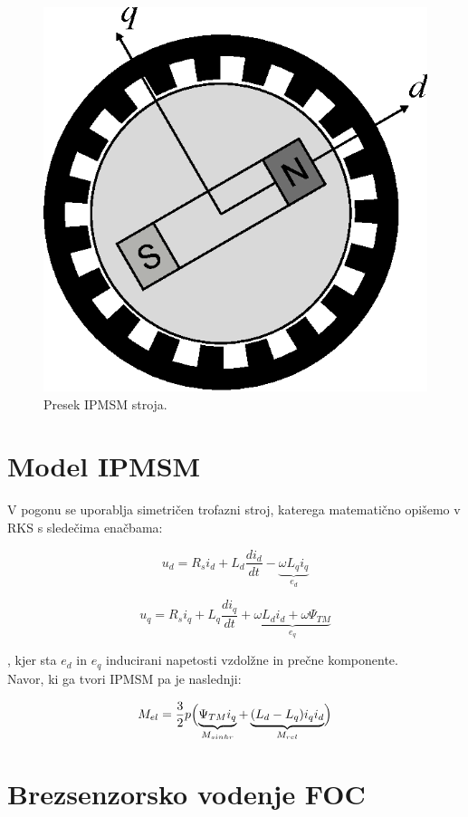 \documentclass[a4paper,twoside,openright,12pt,slovene]{book}
\begin{document}
\begin{figure}[!htbp]
    \centering
    \includegraphics[width=0.5\columnwidth]{Slike/Inkscape/IPMSMsimple.eps}
    \caption{\label{IPMSM} Presek IPMSM stroja.}
\end{figure}


\section{Model IPMSM} \label{motor}

V pogonu se uporablja simetričen trofazni stroj, katerega matematično opišemo v RKS s sledečima enačbama:

\begin{equation} \label{motorModelD}
    u_d = R_si_d+L_d\frac{di_d}{dt}-\underbrace{\omega L_qi_q}_{e_d}
\end{equation}

\begin{equation} \label{motorModelQ}
    u_q = R_si_q+L_q\frac{di_q}{dt}+\underbrace{\omega L_di_d + \omega\Psi_{TM}}_{e_q}
\end{equation}

, kjer sta $e_d$ in $e_q$ inducirani napetosti vzdolžne in prečne komponente.
\\
Navor, ki ga tvori IPMSM pa je naslednji:

\begin{equation}
    M_{el} = \frac{3}{2}p\Bigl(\underbrace{\Psi_{TM}i_q}_{M_{sinhr}}+\underbrace{(L_d-L_q)i_qi_d}_{M_{rel}}\Bigr)
\end{equation}


\section{Brezsenzorsko vodenje FOC}
\end{document}
